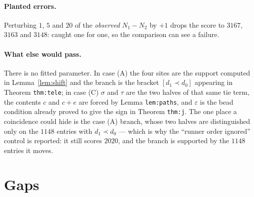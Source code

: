 \documentclass[11pt]{article}
\theoremstyle{definition}
\theoremstyle{remark}
\begin{document}
\paragraph{Planted errors.} Perturbing $1$, $5$ and $20$ of the \emph{observed}
$N_1-N_2$ by $+1$ drops the score to $3167$, $3163$ and $3148$: caught one for one, so
the comparison can see a failure.

\paragraph{What else would pass.} There is no fitted parameter. In case (A) the four
sites are the support computed in Lemma~\ref{lem:shift} and the branch is the bracket
$[d_1\prec d_0]$ appearing in Theorem \texttt{thm:tele}; in case (C) $\sigma$ and $\tau$
are the two halves of that same tie term, the contents $c$ and $c+e$ are forced by Lemma
\texttt{lem:paths}, and $\varepsilon$ is the bead condition already proved to give the
sign in Theorem \texttt{thm:j}. The one place a coincidence could hide is the case (A)
branch, whose two halves are distinguished only on the $1148$ entries with $d_1\prec d_0$
--- which is why the ``runner order ignored'' control is reported: it still scores
$2020$, and the branch is supported by the $1148$ entries it moves.

\section{Gaps}\label{sec:gaps}
\end{document}
